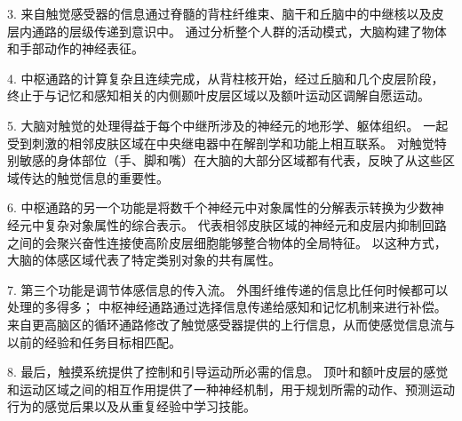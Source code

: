 3. 来自触觉感受器的信息通过脊髓的背柱纤维束、脑干和丘脑中的中继核以及皮层内通路的层级传递到意识中。 
通过分析整个人群的活动模式，大脑构建了物体和手部动作的神经表征。


4. 中枢通路的计算复杂且连续完成，从背柱核开始，经过丘脑和几个皮层阶段，终止于与记忆和感知相关的内侧颞叶皮层区域以及额叶运动区调解自愿运动。


5. 大脑对触觉的处理得益于每个中继所涉及的神经元的地形学、躯体组织。
一起受到刺激的相邻皮肤区域在中央继电器中在解剖学和功能上相互联系。
对触觉特别敏感的身体部位（手、脚和嘴）在大脑的大部分区域都有代表，反映了从这些区域传达的触觉信息的重要性。 


6. 中枢通路的另一个功能是将数千个神经元中对象属性的分解表示转换为少数神经元中复杂对象属性的综合表示。
代表相邻皮肤区域的神经元和皮层内抑制回路之间的会聚兴奋性连接使高阶皮层细胞能够整合物体的全局特征。
以这种方式，大脑的体感区域代表了特定类别对象的共有属性。


7. 第三个功能是调节体感信息的传入流。
外围纤维传递的信息比任何时候都可以处理的多得多； 中枢神经通路通过选择信息传递给感知和记忆机制来进行补偿。
来自更高脑区的循环通路修改了触觉感受器提供的上行信息，从而使感觉信息流与以前的经验和任务目标相匹配。 


8. 最后，触摸系统提供了控制和引导运动所必需的信息。
顶叶和额叶皮层的感觉和运动区域之间的相互作用提供了一种神经机制，用于规划所需的动作、预测运动行为的感觉后果以及从重复经验中学习技能。


